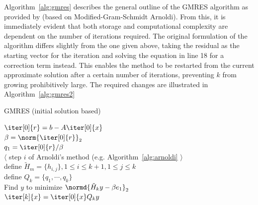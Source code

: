 \noindent Algorithm~\hyperref[alg:gmres]{\ref{alg:gmres}} describes the general outline of the GMRES algorithm as provided by \cite{trefethen_numerical_1997} (based on Modified-Gram-Schmidt Arnoldi). From this, it is immediately evident that both storage and computational complexity are dependent on the number of iterations required. The original formulation of the algorithm \cite{saad_gmres_1986} differs slightly from the one given above, taking the residual as the starting vector for the iteration and solving the equation in line 18 for a correction term instead. This enables the method to be restarted from the current approximate solution after a certain number of iterations, preventing $k$ from growing prohibitively large. The required changes are illustrated in Algorithm~\hyperref[alg:gmres2]{\ref{alg:gmres2}}

\begin{algorithm}[h]
  \caption{GMRES (initial solution based)}
  \label{alg:gmres2}
  \SetAlgoLined
  \DontPrintSemicolon
  $\iter[0]{r} = b-A\iter[0]{x}$ \\
  $\beta = \norm{\iter[0]{r}}_2$ \\
  $q_1 = \iter[0]{r}/\beta$ \\
   {
   $\langle$ step $i$ of Arnoldi's method (e.g. Algorithm~\hyperref[alg:arnoldi]{\ref{alg:arnoldi}} $\rangle$ \\
  }
  define $\tilde{H}_m = \{h_{i,j}\}, 1 \leq i \leq k+1, 1 \leq j \leq k$ \\
  define $Q_k = \{q_1, \cdots, q_k\}$ \\
  Find $y$ to minimize $\normd{\tilde{H}_ky-\beta e_1}_2$ \\
  $\iter[k]{x} = \iter[0]{x}Q_ky$
\end{algorithm}

